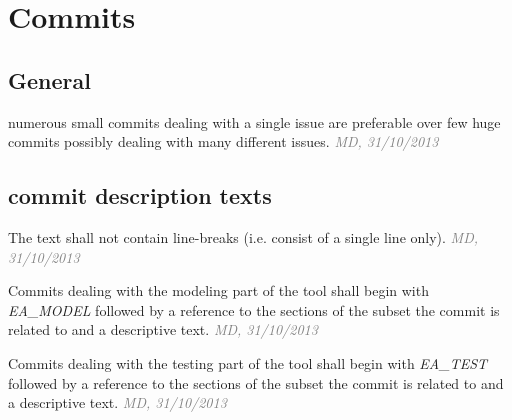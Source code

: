 \documentclass[draft, a4paper, oneside]{scrreprt}
\let\emph\textsl
\newcommand{\literally}[1]{\textsf{\emph{#1}}}
\newcommand{\ruleauthor}[2]{\mbox{}\newline\mbox{}\hfill{\footnotesize\textcolor{gray}{\emph{#1, #2}}}\xspace}}
\newcommand{\ruleauthor}[2]{}
\begin{document}
\section{Commits}
\subsection{General}
\begin{rules}
\item \label{rule:smallcommits} numerous small commits dealing with a single issue are preferable over few huge commits possibly dealing with many different issues. \ruleauthor{MD}{31/10/2013}
\end{rules}

\subsection{commit description texts}
\label{rules:committexts}
\begin{rules}
\item The text shall not contain line-breaks (i.e. consist of a single line only). \ruleauthor{MD}{31/10/2013}
\item Commits dealing with the modeling part of the tool shall begin with \literally{EA_MODEL} followed by a reference to the sections of the subset the commit is related to and a descriptive text. \ruleauthor{MD}{31/10/2013}
\item Commits dealing with the testing part of the tool shall begin with \literally{EA_TEST} followed by a reference to the sections of the subset the commit is related to and a descriptive text. \ruleauthor{MD}{31/10/2013}
\end{rules}
\end{document}
